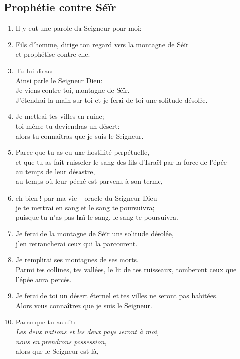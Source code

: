 \documentclass[12pt,a4paper,titlepage]{article}
\def \pslabelsep{0.2em} %
\def \psleftmargin{0em} %
\begin{document}
\subsection*{Prophétie contre Séïr}
\begin{enumerate}[leftmargin=\psleftmargin, labelsep = \pslabelsep, label={\arabic*}, font=\color{\pscolor}\small\textsuperscript, parsep=0em, itemsep=0em, topsep=0em ]
\item Il y eut une parole du Seigneur pour moi:
\item Fils d’homme, dirige ton regard vers la montagne de Séïr \\ et prophétise contre elle.
\item Tu lui diras: \\ Ainsi parle le Seigneur Dieu: \\ Je viens contre toi, montagne de Séïr. \\
J’étendrai la main sur toi et je ferai de toi une solitude désolée.
\item Je mettrai tes villes en ruine; \\ toi-même tu deviendras un désert: \\ alors tu connaîtras que je suis le Seigneur.
\item Parce que tu as eu une hostilité perpétuelle, \\ et que tu as fait ruisseler le sang des fils d’Israël par la force de l’épée \\ au temps de leur désastre, \\ au temps où leur péché est parvenu à son terme,
\item eh bien ! par ma vie – oracle du Seigneur Dieu – \\ je te mettrai en sang et le sang te poursuivra; \\ puisque tu n’as pas haï le sang, le sang te poursuivra.
\item Je ferai de la montagne de Séïr une solitude désolée, \\ j’en retrancherai ceux qui la parcourent.
\item Je remplirai ses montagnes de ses morts. \\ Parmi tes collines, tes vallées, le lit de tes ruisseaux, tomberont ceux que l’épée aura percés.
\item Je ferai de toi un désert éternel et tes villes ne seront pas habitées. \\ Alors vous connaîtrez que je suis le Seigneur.
\item Parce que tu as dit: \\ \decalage \og{}\emph{Les deux nations et les deux pays seront à moi, \\ \decalage nous en prendrons possession}\fg{}, \\ alors que le Seigneur est là,

\end{enumerate}
\end{document}

